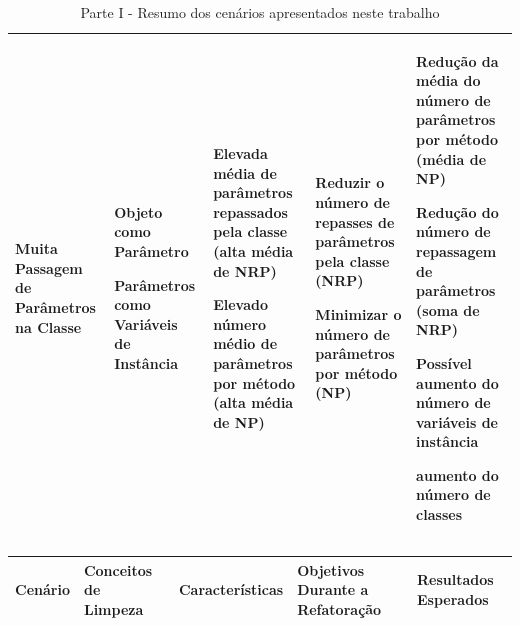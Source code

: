 \begin{landscape}
\begin{table}[hbt]
\begin{tabular}{|p{3cm}|p{4.5cm}|p{5.0cm}|p{5.5cm}|p{5.0cm}|}
\hline 
Muita Passagem de Parâmetros na Classe                         
& \begin{my_itemize}
    \item Objeto como Parâmetro
	\item Parâmetros como Variáveis de Instância
  \end{my_itemize}
& \begin{my_itemize}                                                  
	\item Elevada média de parâmetros repassados pela classe (alta média de NRP)
    \item Elevado número médio de parâmetros por método (alta média de NP)
   \end{my_itemize}
& \begin{my_itemize}
	\item Reduzir o número de repasses de parâmetros pela classe (NRP)
	\item Minimizar o número de parâmetros por método (NP)
  \end{my_itemize}
& \begin{my_itemize}                                                 
	\item Redução da média do número de parâmetros por método (média de NP)
	\item Redução do número de repassagem de parâmetros (soma de NRP)
	\item Possível aumento do número de variáveis de instância
	\item aumento do número de classes
  \end{my_itemize}
\tabularnewline                              


\hline
\end{tabular}
\caption{Parte I - Resumo dos cenários apresentados neste trabalho}
\end{table}
                  


\begin{table}[hbt]
\begin{tabular}{|p{3cm}|p{4.5cm}|p{5.0cm}|p{5.5cm}|p{5.0cm}|}
\hline 
\textbf{Cenário} & \textbf{Conceitos de Limpeza} & \textbf{Características} & \textbf{Objetivos Durante a Refatoração} & \textbf{Resultados Esperados} \tabularnewline
\hline                                              


\end{tabular}
\end{table}
\end{landscape}
